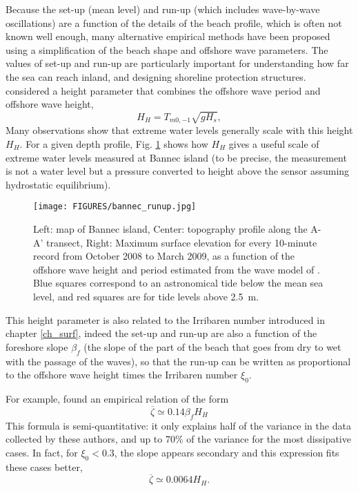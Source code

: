 Because the set-up (mean level) and run-up (which includes wave-by-wave oscillations) are a function of the details of the beach profile, which is often not known well enough, many alternative empirical methods have been proposed using a simplification of the beach shape and offshore wave parameters. The values of set-up and run-up are particularly important for understanding how far the sea can reach inland, and designing shoreline protection structures.  \cite{Hunt1959} considered a height parameter that combines the offshore wave period and offshore wave height, 
\begin{equation}
H_H=T_{m0,-1} \sqrt{g H_s},
\end{equation}
Many observations show that extreme water levels generally scale with this height $H_H$.  For a given depth profile, Fig. \ref{bannec_runup}  shows how $H_H$ gives a useful scale of extreme water levels measured at Bannec island (to be precise, the measurement is not a water level but a pressure converted to height above the sensor assuming hydrostatic equilibrium). 
\begin{figure}
\centerline{\texttt{[image: FIGURES/bannec\_runup.jpg]}}
  \caption{Left: map of Bannec island, Center: topography profile along the A-A' transect, Right: Maximum surface elevation for every 10-minute record from October 2008 to March 2009, as a function of the offshore wave height and period estimated from the wave model of \cite{Ardhuin&Magne2010}. Blue squares correspond to an astronomical tide below the mean sea level, and red squares are for tide levels above 2.5~m.}
\label{bannec_runup}
\end{figure}
This height parameter is also related to the Irribaren number introduced in chapter \ref{ch_surf}, indeed the set-up and run-up are also a function of the foreshore slope $\beta_f$ (the slope of the part of the beach that goes from dry to wet with the passage of the waves), so that the run-up can be written as proportional to the offshore wave height times the Irribaren number $\xi_0$. 

For example, \cite{Stockdon&al.2006} found an empirical relation of the form 
\begin{equation}
    \overline{\zeta} \simeq  0.14 \beta_f H_H
\end{equation}
This formula is semi-quantitative: it only explains half of the variance in the data collected by these authors, and up to 70\% of the variance for the most dissipative cases. In fact, for $\xi_0 < 0.3$, the slope appears secondary and this expression fits these cases better, 
\begin{equation}
    \overline{\zeta} \simeq  0.0064  H_H.
\end{equation}

